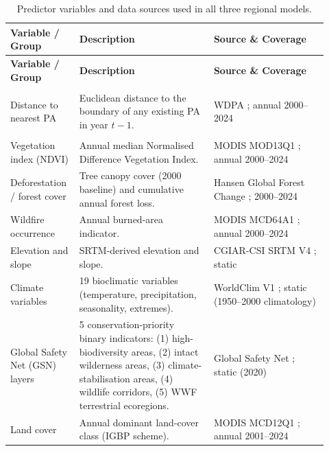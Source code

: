 \documentclass[12pt]{article}
\theoremstyle{break}
\begin{document}
\renewcommand{\arraystretch}{0.85}%
\begin{longtable}{%
  >{\raggedright\arraybackslash\footnotesize}p{0.18\linewidth}%
  >{\raggedright\arraybackslash\footnotesize}p{0.40\linewidth}%
  >{\raggedright\arraybackslash\footnotesize}p{0.34\linewidth}%
}
\caption{Predictor variables and data sources used in all three regional models.}
\label{tab:data} \\
\toprule
\textbf{Variable / Group} & \textbf{Description} & \textbf{Source \& Coverage} \\
\midrule
\endfirsthead
\toprule
\textbf{Variable / Group} & \textbf{Description} & \textbf{Source \& Coverage} \\
\midrule
\endhead
\bottomrule
\endlastfoot

\multicolumn{3}{l}{\textbf{Existing Conservation Context}} \\
\addlinespace[3pt]
Distance to nearest PA &
  Euclidean distance to the boundary of any existing PA in year $t-1$.
 &  WDPA \citep{wdpa}; annual 2000--2024 \\

 \addlinespace[3pt]
\multicolumn{3}{l}{\textbf{Environmental and Ecological Conditions}} \\
\addlinespace[3pt]
Vegetation index (NDVI) &
  Annual median Normalised Difference Vegetation Index. &
  MODIS MOD13Q1 \citep{didan2021}; annual 2000--2024 \\
\addlinespace[3pt]
Deforestation / forest cover &
  Tree canopy cover (2000 baseline) and cumulative annual forest loss. &
  Hansen Global Forest Change \citep{hansen2013}; 2000--2024 \\
\addlinespace[3pt]
Wildfire occurrence &
  Annual burned-area indicator. &
  MODIS MCD64A1 \citep{giglio2021}; annual 2000--2024 \\
\addlinespace[3pt]
Elevation and slope &
  SRTM-derived elevation and slope. &
  CGIAR-CSI SRTM V4 \citep{jarvis2008}; static \\
\addlinespace[3pt]
Climate variables &
  19 bioclimatic variables (temperature, precipitation, seasonality, extremes). &
  WorldClim V1 \citep{hijmans2005}; static (1950--2000 climatology) \\
\addlinespace[3pt]
Global Safety Net (GSN) layers &
  5 conservation-priority binary indicators: (1) high-biodiversity areas, (2) intact wilderness areas, (3) climate-stabilisation areas, (4) wildlife corridors, (5) WWF terrestrial ecoregions. &
  Global Safety Net \citep{dinerstein2020}; static (2020) \\
\addlinespace[3pt]
Land cover &
  Annual dominant land-cover class (IGBP scheme). &
  MODIS MCD12Q1 \citep{friedl2022}; annual 2001--2024 \\


\end{longtable}
\end{document}
